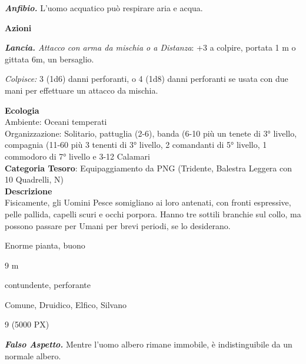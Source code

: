 \begin{multicols}{2}
{\emph{\textbf{Anfibio.}} L'uomo acquatico può respirare aria e acqua.

\textbf{Azioni}

\emph{\textbf{Lancia.} Attacco con arma da mischia o a Distanza}: +3 a colpire, portata 1 m o gittata 6m, un bersaglio.

\emph{Colpisce:} 3 (1d6) danni perforanti, o 4 (1d8) danni perforanti se usata con due mani per effettuare un attacco da mischia.

\textbf{Ecologia}\\
Ambiente: Oceani temperati\\
Organizzazione: Solitario, pattuglia (2-6), banda (6-10 più un tenete di 3° livello, compagnia (11-60 più 3 tenenti di 3° livello, 2 comandanti di 5° livello, 1 commodoro di 7° livello e 3-12 Calamari\\
\textbf{Categoria Tesoro}: Equipaggiamento da PNG (Tridente, Balestra Leggera con 10 Quadrelli, N)\\
\textbf{Descrizione}\\
Fisicamente, gli Uomini Pesce somigliano ai loro antenati, con fronti espressive, pelle pallida, capelli scuri e occhi porpora. Hanno tre sottili branchie sul collo, ma possono passare per Umani per brevi periodi, se lo desiderano.

\begin{description}[noitemsep, topsep=0pt, parsep=0pt, partopsep=0pt, itemsep=1pt, leftmargin=2.35cm,  labelwidth=2.2cm, itemindent=0cm, listparindent=0pt] %
\setlength{\baselineskip}{10pt}
\item[\textbf{Taglia/Tipo}] Enorme pianta, buono
\item[\textbf{Caratt.}] 
\item[\textbf{Punti Ferita}] 
\item[\textbf{Movimento}] 9 m
\item[\textbf{Tiri Salvez.}] 
\item[\textbf{Res. Danni}] contundente, perforante
\item[\textbf{Linguaggi}] Comune, Druidico, Elfico, Silvano
\item[\textbf{Sfida}] 9 (5000 PX)
\end{description}
\smallskip

\emph{\textbf{Falso Aspetto.}} Mentre l'uomo albero rimane immobile, è indistinguibile da un normale albero.

}
\end{multicols}
